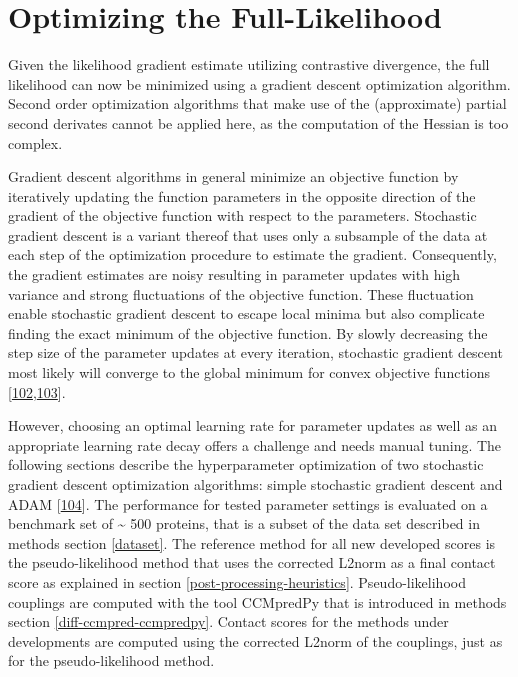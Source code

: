 \documentclass[12pt,a4paper,twoside]{book}
\theoremstyle{definition}
\theoremstyle{definition}
\theoremstyle{remark}
\begin{document}
\section{Optimizing the
Full-Likelihood}\label{methods-optimizing-full-likelihood}

Given the likelihood gradient estimate utilizing contrastive divergence,
the full likelihood can now be minimized using a gradient descent
optimization algorithm. Second order optimization algorithms that make
use of the (approximate) partial second derivates cannot be applied
here, as the computation of the Hessian is too complex.

Gradient descent algorithms in general minimize an objective function by
iteratively updating the function parameters in the opposite direction
of the gradient of the objective function with respect to the
parameters. Stochastic gradient descent is a variant thereof that uses
only a subsample of the data at each step of the optimization procedure
to estimate the gradient. Consequently, the gradient estimates are noisy
resulting in parameter updates with high variance and strong
fluctuations of the objective function. These fluctuation enable
stochastic gradient descent to escape local minima but also complicate
finding the exact minimum of the objective function. By slowly
decreasing the step size of the parameter updates at every iteration,
stochastic gradient descent most likely will converge to the global
minimum for convex objective functions
{[}\protect\hyperlink{ref-Ruder2017}{102},\protect\hyperlink{ref-Bottou2012}{103}{]}.

However, choosing an optimal learning rate for parameter updates as well
as an appropriate learning rate decay offers a challenge and needs
manual tuning. The following sections describe the hyperparameter
optimization of two stochastic gradient descent optimization algorithms:
simple stochastic gradient descent and ADAM
{[}\protect\hyperlink{ref-Kingma2014}{104}{]}. The performance for
tested parameter settings is evaluated on a benchmark set of
\textasciitilde{} 500 proteins, that is a subset of the data set
described in methods section \ref{dataset}. The reference method for all
new developed scores is the pseudo-likelihood method that uses the
corrected L2norm as a final contact score as explained in section
\ref{post-processing-heuristics}. Pseudo-likelihood couplings are
computed with the tool CCMpredPy that is introduced in methods section
\ref{diff-ccmpred-ccmpredpy}. Contact scores for the methods under
developments are computed using the corrected L2norm of the couplings,
just as for the pseudo-likelihood method.
\end{document}
